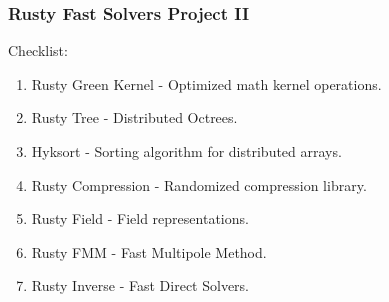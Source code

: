 \begin{frame}
    \frametitle{Rusty Fast Solvers Project II}

    Checklist:

    \begin{enumerate}
        \item \color{green} Rusty Green Kernel  \color{black} - Optimized math kernel operations.
        \item \color{green} Rusty Tree \color{black} - Distributed Octrees.
        \item \color{green} Hyksort  \color{black} - Sorting algorithm for distributed arrays.
        \item \color{orange} Rusty Compression \color{black} - Randomized compression library.
        \item \color{orange} Rusty Field \color{black} - Field representations.
        \item \color{red} Rusty FMM \color{black} - Fast Multipole Method.
        \item \color{red} Rusty Inverse \color{black} - Fast Direct Solvers.
    \end{enumerate}

\end{frame}